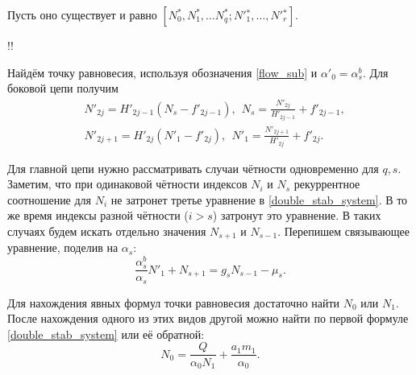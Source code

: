 Пусть оно существует и равно \( [N^*_0, N^*_1, \dots N^*_q; N'{}^*_1, \dots, N'{}^*_r] \).

!!

Найдём точку равновесия, используя обозначения \eqref{flow_sub} и \(\alpha'_0 = \alpha^b_s\). Для боковой цепи получим
\begin{equation}
    \begin{split}
        & N'_{2j} = H'_{2j-1} (N_s - f'_{2j-1}), ~~ N_s = \frac{N'_{2j}}{H'_{2j-1}} + f'_{2j-1}, \\
        & N'_{2j+1} = H'_{2j} (N'_1 - f'_{2j}), ~~ N'_1 = \frac{N'_{2j+1}}{H'_{2j}} + f'_{2j}.
    \end{split}
\end{equation}

Для главной цепи нужно рассматривать случаи чётности одновременно для \(q, s\). Заметим, что при одинаковой чётности индексов \(N_i\) и \(N_s\) рекуррентное соотношение для \(N_i\) не затронет третье уравнение в \eqref{double_stab_system}. В то же время индексы разной чётности (\(i > s\)) затронут это уравнение. В таких случаях будем искать отдельно значения \(N_{s+1}\) и \(N_{s-1}\). Перепишем связывающее уравнение, поделив на \(\alpha_s\):
\begin{equation*}
    \frac{\alpha^b_s}{\alpha_s} N'_1 + N_{s+1} = g_s N_{s-1} - \mu_{s}.
\end{equation*}

Для нахождения явных формул точки равновесия достаточно найти \(N_0\) или \(N_1\). После нахождения одного из этих видов другой можно найти по первой формуле \eqref{double_stab_system} или её обратной:
\begin{equation} \label{split_N0_from_N1}
    N_0 = \frac{Q}{\alpha_0 N_1} + \frac{a_1 m_1}{\alpha_0}.
\end{equation}

